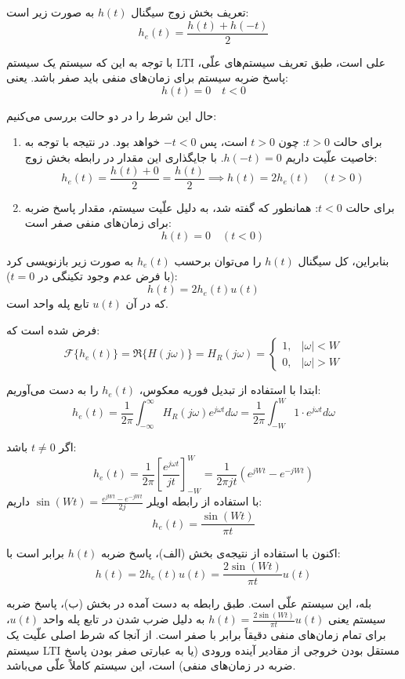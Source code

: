 
تعریف بخش زوج سیگنال $h(t)$ به صورت زیر است:
\[ h_e(t) = \frac{h(t) + h(-t)}{2} \]

با توجه به این که سیستم یک سیستم LTI {علی} است، طبق تعریف سیستم‌های علّی، پاسخ ضربه سیستم برای زمان‌های منفی باید صفر باشد. یعنی:
\[ h(t) = 0 \quad t < 0 \]

حال این شرط را در دو حالت بررسی می‌کنیم:

\begin{enumerate}
    \item {برای حالت $t > 0$:}
    چون $t > 0$ است، پس $-t < 0$ خواهد بود. در نتیجه با توجه به خاصیت علّیت داریم $h(-t) = 0$. با جایگذاری این مقدار در رابطه بخش زوج:
    \[ h_e(t) = \frac{h(t) + 0}{2} = \frac{h(t)}{2} \implies h(t) = 2h_e(t) \quad (t > 0) \]
    
    \item {برای حالت $t < 0$:}
    همانطور که گفته شد، به دلیل علّیت سیستم، مقدار پاسخ ضربه برای زمان‌های منفی صفر است:
    \[ h(t) = 0 \quad (t < 0) \]
\end{enumerate}

بنابراین، کل سیگنال $h(t)$ را می‌توان برحسب $h_e(t)$ به صورت زیر بازنویسی کرد (با فرض عدم وجود تکینگی در $t=0$):
\[ h(t) = 2h_e(t)u(t) \]
که در آن $u(t)$ تابع پله واحد است.

فرض شده است که:
\[ \mathcal{F}\{h_e(t)\} = \Re\{H(j\omega)\} = H_R(j\omega) = \begin{cases} 1, & |\omega| < W \\ 0, & |\omega| > W \end{cases} \]

ابتدا با استفاده از تبدیل فوریه معکوس، $h_e(t)$ را به دست می‌آوریم:
\[ h_e(t) = \frac{1}{2\pi} \int_{-\infty}^{\infty} H_R(j\omega) e^{j\omega t} d\omega = \frac{1}{2\pi} \int_{-W}^{W} 1 \cdot e^{j\omega t} d\omega \]

اگر $t \neq 0$ باشد:
\[ h_e(t) = \frac{1}{2\pi} \left[ \frac{e^{j\omega t}}{jt} \right]_{-W}^{W} = \frac{1}{2\pi j t} \left( e^{jWt} - e^{-jWt} \right) \]
با استفاده از رابطه اویلر $\sin(Wt) = \frac{e^{jWt} - e^{-jWt}}{2j}$ داریم:
\[ h_e(t) = \frac{\sin(Wt)}{\pi t} \]

اکنون با استفاده از نتیجه‌ی بخش (الف)، پاسخ ضربه $h(t)$ برابر است با:
\[ h(t) = 2h_e(t)u(t) = \frac{2\sin(Wt)}{\pi t} u(t) \]

 بله، این سیستم علّی است.
 طبق رابطه به دست آمده در بخش (ب)، پاسخ ضربه سیستم یعنی $h(t) = \frac{2\sin(Wt)}{\pi t} u(t)$ به دلیل ضرب شدن در تابع پله واحد $u(t)$، برای تمام زمان‌های منفی دقیقاً برابر با صفر است. از آنجا که شرط اصلی علّیت یک سیستم LTI مستقل بودن خروجی از مقادیر آینده ورودی (یا به عبارتی صفر بودن پاسخ ضربه در زمان‌های منفی) است، این سیستم کاملاً علّی می‌باشد.
